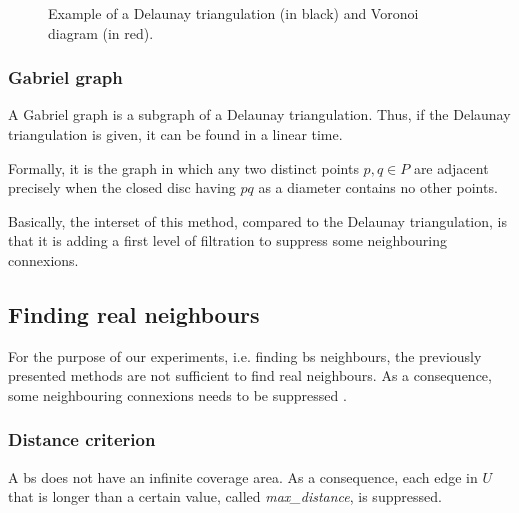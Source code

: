 \documentclass[lettersize,journal,english]{IEEEtran}
\begin{document}
            \begin{figure}
                \centering
                \caption{Example of a Delaunay triangulation (in black) and Voronoi diagram (in red).}
                \label{fig:del_tri}
            \end{figure}

        \subsubsection{Gabriel graph}
            A Gabriel graph \cite{10.2307/2412323} is a subgraph of a Delaunay triangulation. Thus, if the Delaunay triangulation is given, it can be found in a linear time. 

            Formally, it is the graph in which any two distinct points $p, q \in P$ are adjacent precisely when the closed disc having $pq$ as a diameter contains no other points.

            Basically, the interset of this method, compared to the Delaunay triangulation, is that it is adding a first level of filtration to suppress some neighbouring connexions.

    \subsection{Finding real neighbours}
        For the purpose of our experiments, i.e. finding \acrshort{bs} neighbours, the previously presented methods are not sufficient to find real neighbours.
        As a consequence, some neighbouring connexions needs to be suppressed \cite{patent_neighs}.
        \subsubsection{Distance criterion}
            A \acrshort{bs} does not have an infinite coverage area.
            As a consequence, each edge in $U$ that is longer than a certain value, called \emph{max\_distance}, is suppressed.
\end{document}
